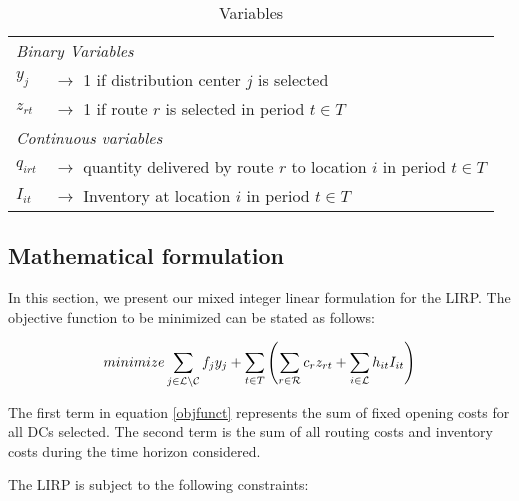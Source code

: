\documentclass[a4paper,10pt]{article}
\begin{document}
\begin{linenumbers}
	\begin{table}[htbp]
	\centering
	\begin{tabular}{ll}
		\toprule
		\multicolumn{2}{l}{\textit{Binary Variables}}\\
		$y_{j}$ & $\rightarrow$ 1 if distribution center $j$ is selected \\
		$z_{rt}$ & $\rightarrow$ 1 if route $r$  is selected in period $t \in T$\\
		\midrule
		\multicolumn{2}{l}{\textit{Continuous variables}}\\
		$q_{irt}$ & $\rightarrow$ quantity delivered by route $r$ to location $i$ in period $t\in T$\\
		$I_{it}$ & $\rightarrow$ Inventory at location $i$ in period $t \in T$\\
		\bottomrule
	\end{tabular}
	\caption{Variables}
	\label{tab:var}
\end{table}    


\subsection{Mathematical  formulation}\label{subsection:MIP}

In this section, we present our mixed integer linear formulation for the LIRP. 
The objective function to be minimized can be stated as follows: 
 
\begin{equation} \label{objfunct}
    {minimize} \sum_{j\in \mathcal{L} \setminus \mathcal{C}} f_{j} y_{j} +\sum_{t\in T} \left( \sum_{r\in \mathcal{R}} c_r z_{rt} + \sum_{i\in \mathcal{L}} h_{it} I_{it}\right)
    \end{equation} 
    
    The first term in equation \ref{objfunct} represents the sum of fixed opening costs for all DCs selected. 
    The second term is the sum of all routing costs and inventory costs during the time horizon considered. 
    
  The LIRP is subject to the following constraints:
    

\end{linenumbers}
\end{document}
